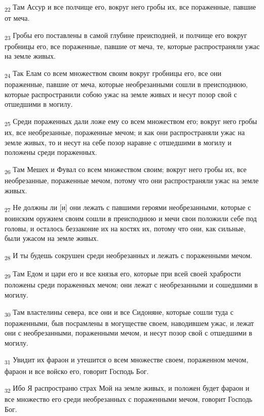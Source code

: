 \begin{tcolorbox}
\textsubscript{22} Там Ассур и все полчище его, вокруг него гробы их, все пораженные, павшие от меча.
\end{tcolorbox}
\begin{tcolorbox}
\textsubscript{23} Гробы его поставлены в самой глубине преисподней, и полчище его вокруг гробницы его, все пораженные, павшие от меча, те, которые распространяли ужас на земле живых.
\end{tcolorbox}
\begin{tcolorbox}
\textsubscript{24} Так Елам со всем множеством своим вокруг гробницы его, все они пораженные, павшие от меча, которые необрезанными сошли в преисподнюю, которые распространили собою ужас на земле живых и несут позор свой с отшедшими в могилу.
\end{tcolorbox}
\begin{tcolorbox}
\textsubscript{25} Среди пораженных дали ложе ему со всем множеством его; вокруг него гробы их, все необрезанные, пораженные мечом; и как они распространяли ужас на земле живых, то и несут на себе позор наравне с отшедшими в могилу и положены среди пораженных.
\end{tcolorbox}
\begin{tcolorbox}
\textsubscript{26} Там Мешех и Фувал со всем множеством своим; вокруг него гробы их, все необрезанные, пораженные мечом, потому что они распространяли ужас на земле живых.
\end{tcolorbox}
\begin{tcolorbox}
\textsubscript{27} Не должны ли [и] они лежать с павшими героями необрезанными, которые с воинским оружием своим сошли в преисподнюю и мечи свои положили себе под головы, и осталось беззаконие их на костях их, потому что они, как сильные, были ужасом на земле живых.
\end{tcolorbox}
\begin{tcolorbox}
\textsubscript{28} И ты будешь сокрушен среди необрезанных и лежать с пораженными мечом.
\end{tcolorbox}
\begin{tcolorbox}
\textsubscript{29} Там Едом и цари его и все князья его, которые при всей своей храбрости положены среди пораженных мечом; они лежат с необрезанными и сошедшими в могилу.
\end{tcolorbox}
\begin{tcolorbox}
\textsubscript{30} Там властелины севера, все они и все Сидоняне, которые сошли туда с пораженными, быв посрамлены в могуществе своем, наводившем ужас, и лежат они с необрезанными, пораженными мечом, и несут позор свой с отшедшими в могилу.
\end{tcolorbox}
\begin{tcolorbox}
\textsubscript{31} Увидит их фараон и утешится о всем множестве своем, пораженном мечом, фараон и все войско его, говорит Господь Бог.
\end{tcolorbox}
\begin{tcolorbox}
\textsubscript{32} Ибо Я распространю страх Мой на земле живых, и положен будет фараон и все множество его среди необрезанных с пораженными мечом, говорит Господь Бог.
\end{tcolorbox}
